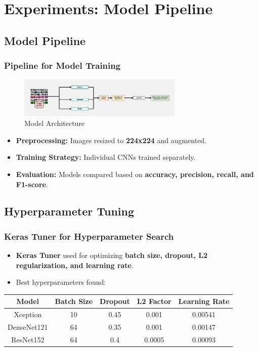 \section{Experiments: Model Pipeline}
\label{sec:experiments}

\subsection{Model Pipeline}
\label{subsec:pipeline}

\begin{frame}
    \frametitle{Pipeline for Model Training}
    \begin{figure}
        \centering
        \includegraphics[width=0.7\textwidth]{images/model}
        \caption{Model Architecture}\label{fig:model}
    \end{figure}
    \begin{itemize}
        \item \textbf{Preprocessing:} Images resized to \textbf{224x224} and augmented.
        \item \textbf{Training Strategy:} Individual CNNs trained separately.
        \item \textbf{Evaluation:} Models compared based on \textbf{accuracy, precision, recall, and F1-score}.
    \end{itemize}
\end{frame}

\subsection{Hyperparameter Tuning}
\label{subsec:hyper-tuning}

\begin{frame}
    \frametitle{Keras Tuner for Hyperparameter Search}
    \begin{itemize}
        \item \textbf{Keras Tuner} used for optimizing \textbf{batch size, dropout, L2 regularization, and learning rate}.
        \item Best hyperparameters found:
    \end{itemize}
    \begin{table}[]
        \centering
        \begin{tabular}{|c|c|c|c|c|}
            \hline
            \textbf{Model} & \textbf{Batch Size} & \textbf{Dropout} & \textbf{L2 Factor} & \textbf{Learning Rate} \\
            \hline
            Xception & 10 & 0.45 & 0.001 & 0.00541 \\
            DenseNet121 & 64 & 0.35 & 0.001 & 0.00147 \\
            ResNet152 & 64 & 0.4 & 0.0005 & 0.00093 \\
            \hline
        \end{tabular}
    \end{table}
\end{frame}

